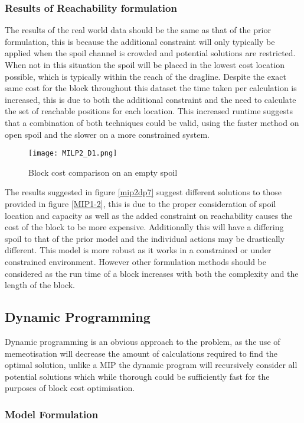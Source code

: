 \subsubsection{Results of Reachability formulation }
The results of the real world data should be the same as that of the prior formulation, this is because the additional constraint will only typically be applied when the spoil channel is crowded and potential solutions are restricted. When not in this situation the spoil will be placed in the lowest cost location possible, which is typically within the reach of the dragline. Despite the exact same cost for the block throughout this dataset the time taken per calculation is increased, this is due to both the additional constraint and the need to calculate the set of reachable positions for each location. This increased runtime suggests that a combination of both techniques could be valid, using the faster method on open spoil and the slower on a more constrained system. 
\begin{figure}[h]
\caption{Block cost comparison on an empty spoil}
\label{MIP-1}
\texttt{[image: MILP2\_D1.png]}
\end{figure}
The results suggested in figure \ref{mip2dp7} suggest different solutions to those provided in figure \ref{MIP1-2}, this is due to the proper consideration of spoil location and capacity as well as the added constraint on reachability causes the cost of the block to be more expensive. Additionally this will have a differing spoil to that of the prior model and the individual actions may be drastically different. This model is more robust as it works in a constrained or under constrained environment. However other formulation methods should be considered as the run time of a block increases with both the complexity and the length of the block. 
\subsection{Dynamic Programming}
Dynamic programming is an obvious approach to the problem, as the use of memeotisation will decrease the amount of calculations required to find the optimal solution, unlike a MIP the dynamic program will recursively consider all potential solutions which while thorough could be sufficiently fast for the purposes of block cost optimisation. 
\subsubsection{Model Formulation}
